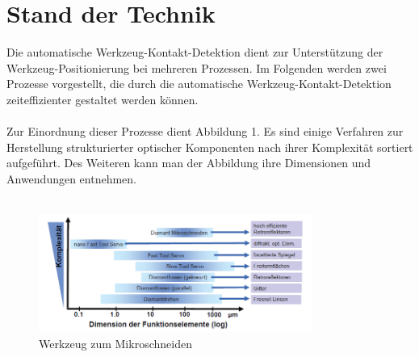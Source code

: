 \documentclass[12pt,a4paper,bibliography=totocnumbered,listof=totocnumbered]{scrartcl}
\begin{document}
\section{Stand der Technik}
Die automatische Werkzeug-Kontakt-Detektion dient zur Unterstützung der Werkzeug-Positionierung bei mehreren Prozessen. Im Folgenden werden zwei Prozesse vorgestellt, die durch die automatische Werkzeug-Kontakt-Detektion zeiteffizienter gestaltet werden können. \\ \\
Zur Einordnung dieser Prozesse dient Abbildung 1. Es sind einige Verfahren zur Herstellung strukturierter optischer Komponenten nach ihrer Komplexität sortiert aufgeführt. Des Weiteren kann man der Abbildung ihre Dimensionen und Anwendungen entnehmen. \\ \\ 
\begin{figure}[htbp]
\centering 
\includegraphics[width=0.8\textwidth]{Fertigungsverfahren.PNG}
\caption{Werkzeug zum Mikroschneiden \cite{oberflaechen}}
\label{fig:Bild1}
\end{figure}
\break
\end{document}
